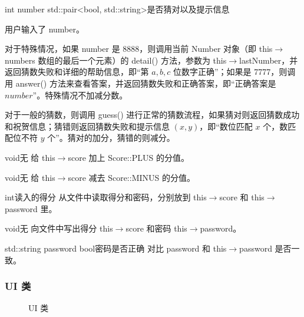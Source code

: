 {int number}
{std::pair<bool, std::string>}{是否猜对以及提示信息}
{用户输入了 number。

对于特殊情况，如果 number 是 8888，则调用当前 Number 对象（即 this$\to$numbers 数组的最后一个元素）的 detail() 方法，参数为 this$\to$lastNumber，并返回猜数失败和详细的帮助信息，即“第 $a,b,c$ 位数字正确”；如果是 7777，则调用 answer() 方法来查看答案，并返回猜数失败和正确答案，即“正确答案是 $number$”。特殊情况不加减分数。

对于一般的猜数，则调用 guess() 进行正常的猜数流程，如果猜对则返回猜数成功和祝贺信息；猜错则返回猜数失败和提示信息 $(x,y)$，即“数位匹配 $x$ 个，数匹配位不符 $y$ 个”。猜对的加分，猜错的则减分。}

{}
{void}{无}
{给 this$\to$score 加上 Score::PLUS 的分值。}

{}
{void}{无}
{给 this$\to$score 减去 Score::MINUS 的分值。}

{}
{int}{读入的得分}
{从文件中读取得分和密码，分别放到 this$\to$score 和 this$\to$password 里。}

{}
{void}{无}
{向文件中写出得分 this$\to$score 和密码 this$\to$password。}

{std::string password}
{bool}{密码是否正确}
{对比 password 和 this$\to$password 是否一致。}

\subsubsection{UI 类}

\begin{figure}[htp]
  \pictext\small
{}
  \caption{\label{UI}UI 类}
\end{figure}

